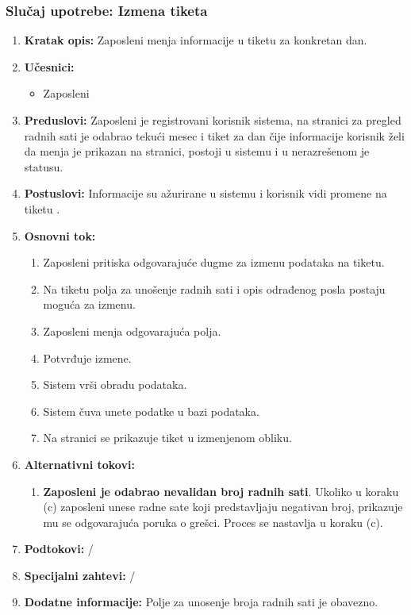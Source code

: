 \documentclass[a4paper]{article}
\begin{document}
\subsubsection{Slučaj upotrebe: Izmena tiketa}
\begin{enumerate}
    \item \textbf{Kratak opis:} Zaposleni menja informacije u tiketu za konkretan dan.
    \item \textbf{Učesnici:}
        \begin{itemize}
            \item Zaposleni
        \end{itemize}
    \item \textbf{Preduslovi:} Zaposleni je registrovani korisnik sistema, na stranici za pregled radnih sati je odabrao tekući mesec i tiket za dan čije informacije korisnik želi da menja je prikazan na stranici, postoji u sistemu i u nerazrešenom je statusu.
    \item \textbf{Postuslovi:} Informacije su ažurirane u sistemu i korisnik vidi promene na tiketu .
    \item \textbf{Osnovni tok:}
        \begin{enumerate}
            \item Zaposleni pritiska odgovarajuće dugme za izmenu podataka na tiketu.
            \item Na tiketu polja za unošenje radnih sati i opis odrađenog posla postaju moguća za izmenu.
            \item Zaposleni menja odgovarajuća polja.
            \item Potvrđuje izmene.
            \item Sistem vrši obradu podataka.
            \item Sistem čuva unete podatke u bazi podataka.
            \item Na stranici se prikazuje tiket u izmenjenom obliku.
        \end{enumerate}
    \item \textbf{Alternativni tokovi:}
        \begin{enumerate}
            \item \textbf{Zaposleni je odabrao nevalidan broj radnih sati}. Ukoliko u koraku (c) zaposleni unese radne sate koji predstavljaju negativan broj, prikazuje mu se odgovarajuća poruka o grešci. Proces se nastavlja u koraku (c).
        \end{enumerate}
    \item \textbf{Podtokovi:} /
    \item \textbf{Specijalni zahtevi:} /
    \item \textbf{Dodatne informacije:} Polje za unosenje broja radnih sati je obavezno.
\end{enumerate}
\end{document}
